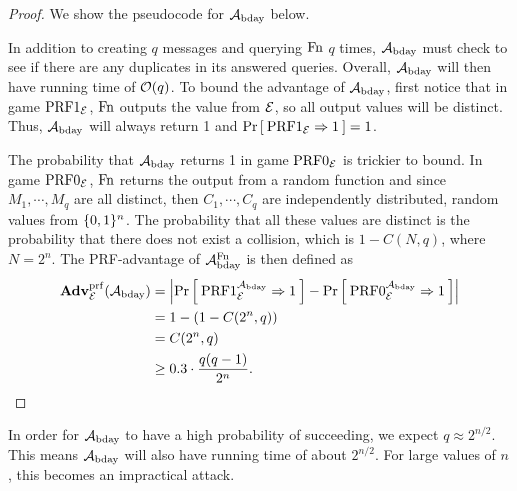 \begin{proof}
	We show the pseudocode for ${\mathcal A}_{\text{bday}}$ below. 
	
	\begin{center}
	\end{center}
	
	In addition to creating $q$ messages and querying $\textnormal{Fn}$ $q$ times, ${\mathcal A}_{\text{bday}}$ must check to see if there are any duplicates in its answered queries. Overall, ${\mathcal A}_{\text{bday}}$ will then have running time of ${\cal O}(q)$.
	To bound the advantage of ${\mathcal A}_{\text{bday}}$, first notice that in game $\textnormal{PRF}1_{{\cal E}}$, $\textnormal{Fn}$ outputs the value from ${\cal E}$, so all output values will be distinct. Thus, ${\mathcal A}_{\text{bday}}$ will always return 1 and $\Pr\left[\: \textnormal{PRF}1_{\cal E}\Rightarrow 1 \:\right]=1$. 
	
	The probability that ${\mathcal A}_{\text{bday}}$ returns 1 in game $\textnormal{PRF}0_{{\cal E}}$ is trickier to bound. In game $\textnormal{PRF}0_{{\cal E}}$, $\textnormal{Fn}$ returns the output from a random function and since $M_1, \cdots, M_q$ are all distinct, then $C_1, \cdots, C_q$ are independently distributed, random values from $\{0,1\}^n$. The probability that all these values are distinct is the probability that there does not exist a collision, which is $1-C(N,q)$, where $N=2^n$. 
	The PRF-advantage of ${\mathcal A}^{\textnormal{Fn}}_{\text{bday}}$ is then defined as 
	\begin{align*}
	\mathbf{Adv}^{\mathrm{prf}}_{{\cal E}}({\mathcal A}_\text{bday}) &= \left| \Pr\left[\: \textnormal{PRF}1_{\cal E}^{{\mathcal A}_\text{bday}}\Rightarrow 1 \:\right] 
	- \Pr\left[\: \textnormal{PRF}0_{\cal E}^{{\mathcal A}_\text{bday}}\Rightarrow1 \:\right] \right| \\
	&= 1 - (1 - C(2^n,q)) \\ 
	&= C(2^n,q) \\ 
	&\geq 0.3 \cdot \frac{q(q-1)}{2^n}.
	\end{align*}
\end{proof} 

In order for ${\mathcal A}_{\text{bday}}$ to have a high probability of succeeding, we expect $q \approx 2^{n/2}$. This means ${\mathcal A}_{\text{bday}}$ will also have running time of about $2^{n/2}$. For large values of $n$, this becomes an impractical attack. 


